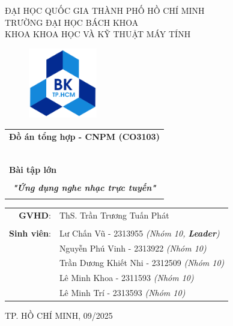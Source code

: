 \documentclass[a4paper]{article}
\begin{document}
\begin{titlepage}
\begin{center}
ĐẠI HỌC QUỐC GIA THÀNH PHỐ HỒ CHÍ MINH\\
TRƯỜNG ĐẠI HỌC BÁCH KHOA\\
KHOA KHOA HỌC VÀ KỸ THUẬT MÁY TÍNH\\
\end{center}

\vspace{1cm}

\begin{figure}[h!]
\begin{center}
\includegraphics[width=3cm]{hcmut.png}
\end{center}
\end{figure}

\vspace{1cm}


\begin{center}
\begin{tabular}{c}
\multicolumn{1}{c}{\textbf{{\Large Đồ án tổng hợp - CNPM (CO3103)}}}\\
~~\\
\hline
\\
\multicolumn{1}{l}{\textbf{{\Large Bài tập lớn}}}\\
\\
\textbf{\textit{{\Huge "Ứng dụng nghe nhạc trực tuyến"}}}\\
\\
\hline
\end{tabular}
\end{center}

\vspace{2cm}

\begin{table}[h]
\centering
    \begin{tabular}{rl}
    \hspace{3 cm}\textbf{GVHD}:
    & ThS. Trần Trương Tuấn Phát\\

    & \\[10pt]
\textbf{Sinh viên}: & Lư Chấn Vũ - 2313955 \emph{(Nhóm 10, \textbf{Leader})} \\
& Nguyễn Phú Vinh - 2313922 \emph{(Nhóm 10)} \\
& Trần Dương Khiết Nhi - 2312509 \emph{(Nhóm 10)} \\
& Lê Minh Khoa - 2311593 \emph{(Nhóm 10)} \\
& Lê Minh Trí - 2313593 \emph{(Nhóm 10)} \\
    \end{tabular}
\end{table}

\begin{center}
{\footnotesize TP. HỒ CHÍ MINH, 09/2025}
\end{center}
\end{titlepage}
\end{document}
